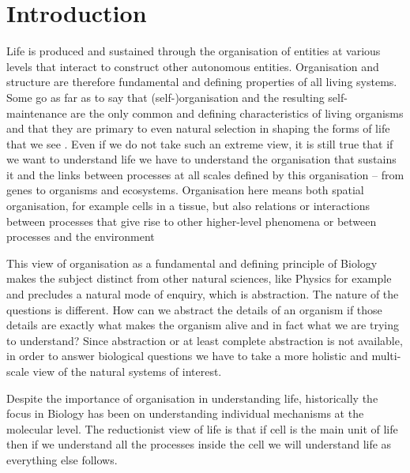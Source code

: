 \documentclass[phd]{infthesis}
\begin{document}
\chapter{Introduction}

Life is produced and sustained through the organisation of entities at various
levels that interact to construct other autonomous entities. Organisation and
structure are therefore fundamental and defining properties of all living
systems. Some go as far as to say that (self-)organisation and the resulting
self-maintenance are the only common and defining characteristics of living
organisms and that they are primary to even natural selection in shaping the
forms of life that we see \citep[sometimes referred to as structuralism, for
example;][]{thompson1942growth, kauffman1992origins}. Even if we do not take such an
extreme view, it is still true that if we want to understand life we have to
understand the organisation that sustains it and the links between processes at
all scales defined by this organisation -- from genes to organisms and
ecosystems. Organisation here means both spatial organisation, for example cells
in a tissue, but also relations or interactions between processes that give rise
to other higher-level phenomena or between processes and the environment

This view of organisation as a fundamental and defining principle of Biology
makes the subject distinct from other natural sciences, like Physics for example
and precludes a natural mode of enquiry, which is abstraction. The nature of the
questions is different. How can we abstract the details of an organism if those
details are exactly what makes the organism alive and in fact what we are trying
to understand? Since abstraction or at least complete abstraction is not
available, in order to answer biological questions we have to take a more
holistic and multi-scale view of the natural systems of interest.

Despite the importance of organisation in understanding life, historically the
focus in Biology has been on understanding individual mechanisms at the
molecular level. The reductionist view of life is that if cell is the main unit
of life then if we understand all the processes inside the cell we will
understand life as everything else follows.
\end{document}
